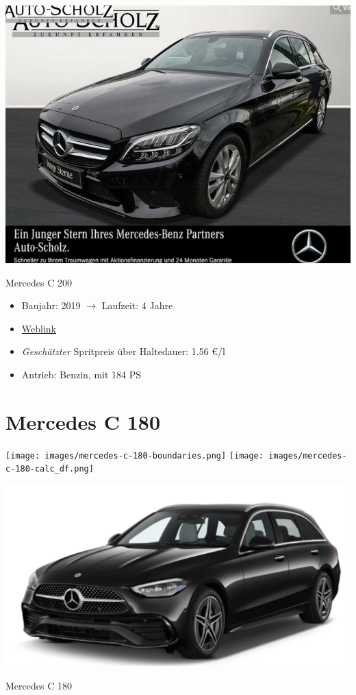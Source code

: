 \documentclass[landscape, DIV=99, 14pt]{scrartcl}
\begin{document}
\pagebreak
\null
\vspace{2cm}
\begin{center}
\includegraphics[width=0.9\columnwidth]{cars/mercedes-c-200-t.png}

Mercedes C 200
\end{center}

\begin{itemize}
    \item Baujahr: 2019 $\rightarrow$ Laufzeit: 4 Jahre
    \item \href{https://suchen.mobile.de/fahrzeuge/details.html?action=parkItem&id=327113608}{Weblink}
    \item \emph{Gesch\"atzter} Spritpreis \"uber Haltedauer: 1.56 \euro{}/l
    \item Antrieb: Benzin, mit 184 PS
\end{itemize}

\pagebreak


\twocolumn

\section*{Mercedes C 180}
\begin{center}
\texttt{[image: images/mercedes-c-180-boundaries.png]}
\null
\vspace{0.5cm}
\texttt{[image: images/mercedes-c-180-calc\_df.png]}
\end{center}

\pagebreak
\null
\vspace{2cm}
\begin{center}
\includegraphics[width=0.9\columnwidth]{cars/mercedes-c-180-t.png}

Mercedes C 180
\end{center}
\end{document}
